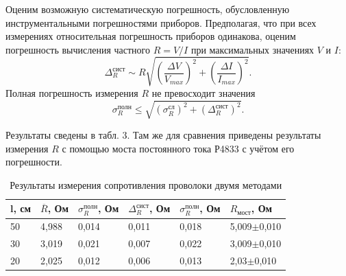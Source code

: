 \documentclass[12pt,a4paper]{article}
\begin{document}
Оценим возможную систематическую погрешность, обусловленную инструментальными
погрешностями приборов. Предполагая, что при всех измерениях относительная погрешность
приборов одинакова, оценим погрешность вычисления частного $R=V/I$ при максимальных
значениях $V$ и $I$:
\begin{equation}
    \Delta ^{сист} _{R} \sim R \sqrt{ \left( \frac {\Delta V}{V_{max}} \right)^2 + \left( \frac {\Delta I}{I_{max}} \right)^2 }.
\end{equation}
Полная погрешность измерения $R$ не превосходит значения
\begin{equation}
    \sigma ^{полн} _{R} \leq \sqrt{ ( \sigma ^{сл} _R )^2 + ( \Delta ^{сист} _{R} )^2 }.
\end{equation}

Результаты сведены в табл. 3. Там же для сравнения приведены результаты измерения $R$ с
помощью моста постоянного тока Р4833 с учётом его погрешности.

\begin{table}[!ht]
    \label{tb:tb3}
    \caption{\newline Результаты измерения сопротивления проволоки двумя методами}
    \centering
    \begin{tabular}{|l|l|l|l|l|l|}
    \hline
        l, см & $\overline{R}$, Ом & $\sigma ^{полн} _{R}$, Ом & $\Delta ^{сист} _{R}$, Ом & $\sigma ^{полн} _{R}$, Ом & $R_{мост}$, Ом \\ \hline
        50 & 4,988 & 0,014  & 0,011  & 0,018 & 5,009$\pm$0,010 \\ \hline
        30 & 3,019  & 0,021 & 0,007 & 0,022 & 3,009$\pm$0,010 \\ \hline
        20 & 2,025 & 0,012  & 0,006  & 0,013 & 2,03$\pm$0,010 \\ \hline
    \end{tabular}
\end{table}
\end{document}
